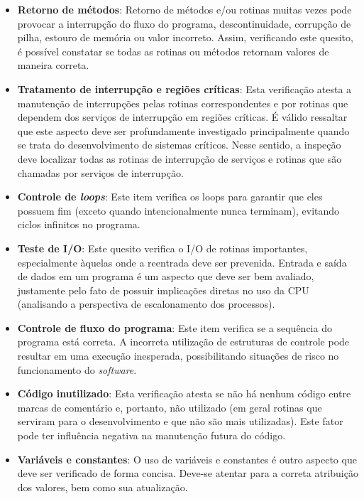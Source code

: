 \begin{itemize}
	\item \textbf{Retorno de métodos}: Retorno de métodos e/ou rotinas muitas vezes pode provocar a interrupção do fluxo do programa, descontinuidade, corrupção de pilha, estouro de memória ou valor incorreto. Assim, verificando este quesito, é possível constatar se todas as rotinas ou métodos retornam valores de maneira correta.

	\item \textbf{Tratamento de interrupção e regiões críticas}: Esta verificação atesta a manutenção de interrupções pelas rotinas correspondentes e por rotinas que dependem dos serviços de interrupção em regiões críticas. É válido ressaltar que este aspecto deve ser profundamente investigado principalmente quando se trata do desenvolvimento de sistemas críticos. Nesse sentido, a inspeção deve localizar todas as rotinas de interrupção de serviços e rotinas que são chamadas por serviços de interrupção.

	\item \textbf{Controle de \textit{loops}}: Este item verifica os loops para garantir que eles possuem fim (exceto quando intencionalmente nunca terminam), evitando ciclos infinitos no programa.

	\item \textbf{Teste de I/O}: Este quesito verifica o I/O de rotinas importantes, especialmente àquelas onde a reentrada deve ser prevenida. Entrada e saída de dados em um programa é um aspecto que deve ser bem avaliado, justamente pelo fato de possuir implicações diretas no uso da CPU (analisando a perspectiva de escalonamento dos processos).

	\item \textbf{Controle de fluxo do programa}: Este item verifica se a sequência do programa está correta. A incorreta utilização de estruturas de controle pode resultar em uma execução inesperada, possibilitando situações de risco no funcionamento do \textit{software}.

	\item \textbf{Código inutilizado}: Esta verificação atesta se não há nenhum código entre marcas de comentário e, portanto, não utilizado (em geral rotinas que serviram para o desenvolvimento e que não são mais utilizadas). Este fator pode ter influência negativa na manutenção futura do código.

	\item \textbf{Variáveis e constantes}: O uso de variáveis e constantes é outro aspecto que deve ser verificado de forma concisa. Deve-se atentar para a correta atribuição dos valores, bem como sua atualização.


\end{itemize}
